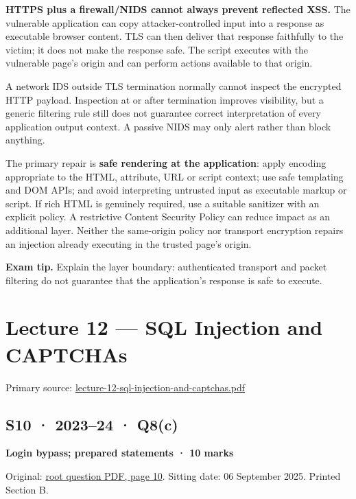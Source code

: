 \documentclass[11pt,a4paper]{article}
\begin{document}
\textbf{HTTPS plus a firewall/\allowbreak{}NIDS cannot always prevent reflected XSS.} The vulnerable application can copy attacker-controlled input into a response as executable browser content. TLS can then deliver that response faithfully to the victim; it does not make the response safe. The script executes with the vulnerable page's origin and can perform actions available to that origin.


A network IDS outside TLS termination normally cannot inspect the encrypted HTTP payload. Inspection at or after termination improves visibility,\allowbreak{} but a generic filtering rule still does not guarantee correct interpretation of every application output context. A passive NIDS may only alert rather than block anything.


The primary repair is \textbf{safe rendering at the application}: apply encoding appropriate to the HTML,\allowbreak{} attribute,\allowbreak{} URL or script context; use safe templating and DOM APIs; and avoid interpreting untrusted input as executable markup or script. If rich HTML is genuinely required,\allowbreak{} use a suitable sanitizer with an explicit policy. A restrictive Content Security Policy can reduce impact as an additional layer. Neither the same-origin policy nor transport encryption repairs an injection already executing in the trusted page's origin.



{\color{ForestGreen}\textbf{Exam tip.} Explain the layer boundary: authenticated transport and packet filtering do not guarantee that the application's response is safe to execute.}



\clearpage
\section{Lecture 12 — SQL Injection and CAPTCHAs}

Primary source: \href{../slides/lecture-12-sql-injection-and-captchas.pdf}{lecture-12-sql-injection-and-captchas.\allowbreak{}pdf}




\subsection{S10 · 2023–24 · Q8(c)}\label{s10}

\textbf{Login bypass; prepared statements · 10 marks}


Original: \href{../../CSE405-Security_Merged.pdf\#page=10}{root question PDF,\allowbreak{} page 10}. Sitting date: 06 September 2025. Printed Section B.
\end{document}
